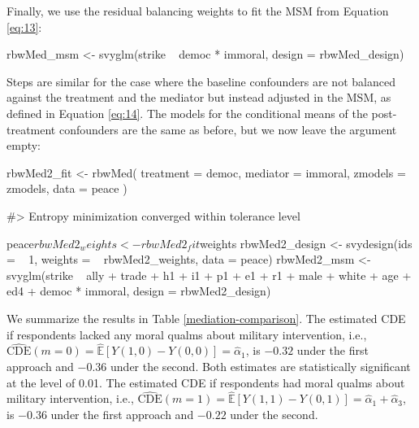 Finally, we use the residual balancing weights to fit the MSM from
Equation \ref{eq:13}:

\begin{Schunk}
\begin{Sinput}
rbwMed_msm <- svyglm(strike ~ democ * immoral,
                     design = rbwMed_design)
\end{Sinput}
\end{Schunk}

Steps are similar for the case where the baseline confounders are not
balanced against the treatment and the mediator but instead adjusted in
the MSM, as defined in Equation \ref{eq:14}. The models for the
conditional means of the post-treatment confounders are the same as
before, but we now leave the  argument empty:

\begin{Schunk}
\begin{Sinput}
rbwMed2_fit <- rbwMed(
  treatment = democ,
  mediator = immoral,
  zmodels = zmodels,
  data = peace
)
\end{Sinput}
\begin{Soutput}
#> Entropy minimization converged within tolerance level
\end{Soutput}
\begin{Sinput}
peace$rbwMed2_weights <- rbwMed2_fit$weights
rbwMed2_design <- svydesign(ids = ~ 1,
                            weights = ~ rbwMed2_weights,
                            data = peace)
rbwMed2_msm <- svyglm(strike ~ ally + trade + h1 + i1 + p1 +
                        e1 + r1 + male + white + age + ed4 + democ * immoral,
                      design = rbwMed2_design)
\end{Sinput}
\end{Schunk}

We summarize the results in Table \ref{mediation-comparison}. The
estimated CDE if respondents lacked any moral qualms about military
intervention, i.e.,
\(\widehat{\text{CDE}}(m=0)=\hat{\mathbb{E}}[Y(1,0)-Y(0,0)]=\hat{\alpha}_{1}\),
is \(-0.32\) under the first approach and \(-0.36\) under the second.
Both estimates are statistically significant at the level of 0.01. The
estimated CDE if respondents had moral qualms about military
intervention, i.e.,
\(\widehat{\text{CDE}}(m=1)=\hat{\mathbb{E}}[Y(1,1)-Y(0,1)]=\hat{\alpha}_{1} + \hat{\alpha}_{3}\),
is \(-0.36\) under the first approach and \(-0.22\) under the second.

